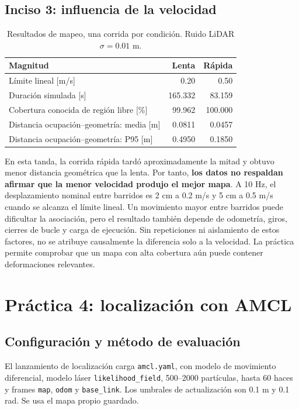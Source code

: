\documentclass[11pt,a4paper]{article}
\newcommand{\archivo}[1]{\nolinkurl{#1}}
\begin{document}
\subsection{Inciso 3: influencia de la velocidad}
\begin{table}[H]\centering\caption{Resultados de mapeo, una corrida por condición. Ruido LiDAR $\sigma=0.01$ m.}
\begin{tabular}{lrr}\toprule
Magnitud & Lenta & Rápida\\\midrule
Límite lineal [m/s] & 0.20 & 0.50\\
Duración simulada [s] & 165.332 & 83.159\\
Cobertura conocida de región libre [\%] & 99.962 & 100.000\\
Distancia ocupación--geometría: media [m] & 0.0811 & 0.0457\\
Distancia ocupación--geometría: P95 [m] & 0.4950 & 0.1850\\\bottomrule
\end{tabular}\end{table}
En esta tanda, la corrida rápida tardó aproximadamente la mitad y obtuvo menor distancia geométrica que la lenta. Por tanto, \textbf{los datos no respaldan afirmar que la menor velocidad produjo el mejor mapa}. A 10 Hz, el desplazamiento nominal entre barridos es 2 cm a 0.2 m/s y 5 cm a 0.5 m/s cuando se alcanza el límite lineal. Un movimiento mayor entre barridos puede dificultar la asociación, pero el resultado también depende de odometría, giros, cierres de bucle y carga de ejecución. Sin repeticiones ni aislamiento de estos factores, no se atribuye causalmente la diferencia solo a la velocidad. La práctica permite comprobar que un mapa con alta cobertura aún puede contener deformaciones relevantes.

\section{Práctica 4: localización con AMCL}
\subsection{Configuración y método de evaluación}
El lanzamiento de localización carga \archivo{amcl.yaml}, con modelo de movimiento diferencial, modelo láser \archivo{likelihood_field}, 500--2000 partículas, hasta 60 haces y frames \archivo{map}, \archivo{odom} y \archivo{base_link}. Los umbrales de actualización son 0.1 m y 0.1 rad. Se usa el mapa propio guardado.
\end{document}
